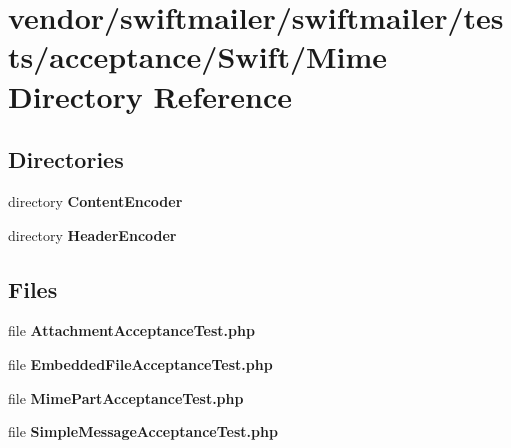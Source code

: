 \section{vendor/swiftmailer/swiftmailer/tests/acceptance/\+Swift/\+Mime Directory Reference}
\label{dir_6f61fb908b96f771bcfae6619ee9ce9d}
\subsection*{Directories}
\begin{DoxyCompactItemize}
\item 
directory {\bf Content\+Encoder}
\item 
directory {\bf Header\+Encoder}
\end{DoxyCompactItemize}
\subsection*{Files}
\begin{DoxyCompactItemize}
\item 
file {\bf Attachment\+Acceptance\+Test.\+php}
\item 
file {\bf Embedded\+File\+Acceptance\+Test.\+php}
\item 
file {\bf Mime\+Part\+Acceptance\+Test.\+php}
\item 
file {\bf Simple\+Message\+Acceptance\+Test.\+php}
\end{DoxyCompactItemize}
